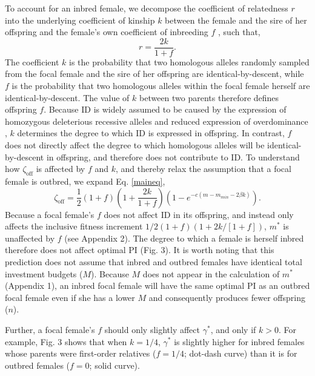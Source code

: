 \documentclass[12pt]{article}
\begin{document}
To account for an inbred female, we decompose the coefficient of relatedness $r$ into the underlying coefficient of kinship $k$ between the female and the sire of her offspring and the female's own coefficient of inbreeding $f$  \cite[see][]{Hamilton1972, Michod1979}, such that,
\begin{equation} \label{rdef}
r = \frac{2k}{1 + f}.
\end{equation}
The coefficient $k$ is the probability that two homologous alleles randomly sampled from the focal female and the sire of her offspring are identical-by-descent, while $f$ is the probability that two homologous alleles within the focal female herself are identical-by-descent. The value of $k$ between two parents therefore defines offspring $f$. Because ID is widely assumed to be caused by the expression of homozygous deleterious recessive alleles and reduced expression of overdominance \cite[][]{Charlesworth2009}, $k$ determines the degree to which ID is expressed in offspring. In contrast, $f$ does not directly affect the degree to which homologous alleles will be identical-by-descent in offspring, and therefore does not contribute to ID. To understand how $\zeta_{\textrm{off}}$ is affected by $f$ and $k$, and thereby relax the assumption that a focal female is outbred, we expand Eq. \ref{maineq},
\begin{equation} \label{maineqr}
\zeta_{\textrm{off}} = \frac{1}{2}\left(1+f\right)\left(1+\frac{2k}{1+f}\right)\left(1-e^{-c\left(m-m_{min}-2\beta k\right)}\right).
\end{equation}
Because a focal female's $f$ does not affect ID in its offspring, and instead only affects the inclusive fitness increment $1/2\left(1+f\right)\left(1+ 2 k / \left[1 + f\right]\right)$, $m^{*}$ is unaffected by $f$  (see Appendix 2). The degree to which a female is herself inbred therefore does not affect optimal PI (Fig. 3). It is worth noting that this prediction does not assume that inbred and outbred females have identical total investment budgets ($M$). Because $M$ does not appear in the calculation of $m^{*}$ (Appendix 1), an inbred focal female will have the same optimal PI as an outbred focal female even if she has a lower $M$ and consequently produces fewer offspring ($n$).

Further, a focal female's $f$ should only slightly affect $\gamma^{*}$, and only if $k>0$. For example, Fig. 3 shows that when $k=1/4$, $\gamma^{*}$ is slightly higher for inbred females whose parents were first-order relatives ($f=1/4$; dot-dash curve) than it is for outbred females ($f=0$; solid curve).
\end{document}

